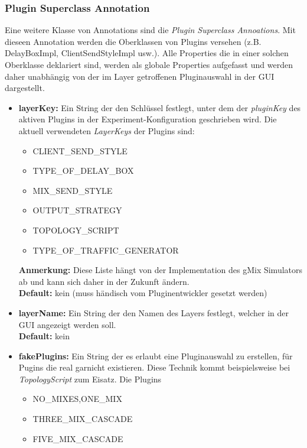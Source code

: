 \documentclass[a4paper, 11pt]{article} %
\begin{document}
\subsubsection{Plugin Superclass Annotation} %
\label{ssub:superclass_annotation}
Eine weitere Klasse von Annotations sind die \emph{Plugin Superclass Annoations}. 
Mit dieseen Annotation werden die Oberklassen von Plugins versehen (z.B. DelayBoxImpl, ClientSendStyleImpl usw.). Alle Properties die in einer solchen Oberklasse deklariert sind, werden als globale Properties aufgefasst und werden daher unabhängig von der im Layer getroffenen Pluginauswahl in der GUI dargestellt. 

\begin{itemize}
	\item \textbf{layerKey:}
	Ein String der den Schlüssel festlegt, unter dem der \emph{pluginKey} des aktiven Plugins in der Experiment-Konfiguration geschrieben wird. Die aktuell verwendeten \emph{LayerKeys} der Plugins sind: 
	\begin{itemize}
		\item CLIENT\_SEND\_STYLE
		\item TYPE\_OF\_DELAY\_BOX
		\item MIX\_SEND\_STYLE
		\item OUTPUT\_STRATEGY
		\item TOPOLOGY\_SCRIPT 
		\item TYPE\_OF\_TRAFFIC\_GENERATOR
	\end{itemize}
	\textbf{Anmerkung:} Diese Liste hängt von der Implementation des gMix Simulators ab und kann sich daher in der Zukunft ändern.\\
	\textbf{Default:} kein (muss händisch vom Pluginentwickler gesetzt werden)
	\item \textbf{layerName:}
	Ein String der den Namen des Layers festlegt, welcher in der GUI angezeigt werden soll.\\
	\textbf{Default:} kein
	\item \textbf{fakePlugins:}
	Ein String der es erlaubt eine Pluginauswahl zu erstellen, für Pugins die real garnicht existieren. Diese Technik kommt beispielsweise bei \emph{TopologyScript} zum Eisatz. Die Plugins  
	\begin{itemize} 
		\item NO\_MIXES,ONE\_MIX
		\item THREE\_MIX\_CASCADE 
		\item FIVE\_MIX\_CASCADE 
	\end{itemize}

\end{itemize}
\end{document}
